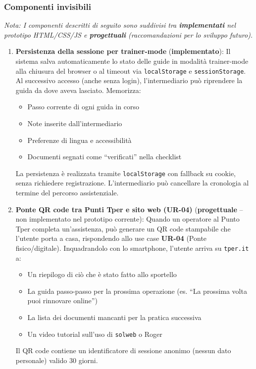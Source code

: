 \begin{tcolorbox}[colback=backgroundColor,colframe=borderColor,arc=2mm]
{\small

\subsubsection{Componenti invisibili}

\noindent\textit{Nota: I componenti descritti di seguito sono suddivisi tra \textbf{implementati} nel prototipo HTML/CSS/JS e \textbf{progettuali} (raccomandazioni per lo sviluppo futuro).}

\begin{enumerate}[leftmargin=*]

 \item \textbf{Persistenza della sessione per trainer-mode} (\textbf{implementato}): Il sistema salva automaticamente lo stato delle guide in modalità trainer-mode alla chiusura del browser o al timeout via \texttt{localStorage} e \texttt{sessionStorage}. Al successivo accesso (anche senza login), l'intermediario può riprendere la guida da dove aveva lasciato. Memorizza:
 \begin{itemize}
   \item Passo corrente di ogni guida in corso
   \item Note inserite dall'intermediario
   \item Preferenze di lingua e accessibilità
   \item Documenti segnati come ``verificati'' nella checklist
 \end{itemize}
 La persistenza è realizzata tramite \texttt{localStorage} con fallback su cookie, senza richiedere registrazione. L'intermediario può cancellare la cronologia al termine del percorso assistenziale.

 \item \textbf{Ponte QR code tra Punti Tper e sito web (UR-04)} (\textbf{progettuale} -- non implementato nel prototipo corrente): Quando un operatore al Punto Tper completa un'assistenza, può generare un QR code stampabile che l'utente porta a casa, rispondendo allo use case \textbf{UR-04} (Ponte fisico/digitale). Inquadrandolo con lo smartphone, l'utente arriva su \texttt{tper.it} a:
 \begin{itemize}
   \item Un riepilogo di ciò che è stato fatto allo sportello
   \item La guida passo-passo per la prossima operazione (es. ``La prossima volta puoi rinnovare online'')
   \item La lista dei documenti mancanti per la pratica successiva
   \item Un video tutorial sull'uso di \texttt{solweb} o Roger
 \end{itemize}
 Il QR code contiene un identificatore di sessione anonimo (nessun dato personale) valido 30 giorni.


\end{enumerate}}
\end{tcolorbox}
